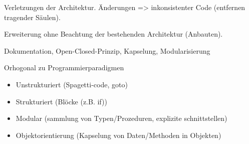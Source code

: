 Verletzungen der Architektur. Änderungen => inkonsistenter Code (entfernen tragender Säulen).

Erweiterung ohne Beachtung der bestehenden Architektur (Anbauten).

 Dokumentation, Open-Closed-Prinzip, Kapselung, Modularisierung

Orhogonal zu Programmierparadigmen
\begin{itemize}
\item Unstrukturiert (Spagetti-code, goto)
\item Strukturiert (Blöcke (z.B. if))
\item Modular (sammlung von Typen/Prozeduren, explizite schnittstellen)
\item Objektorientierung (Kapselung von Daten/Methoden in Objekten)
\end{itemize}
